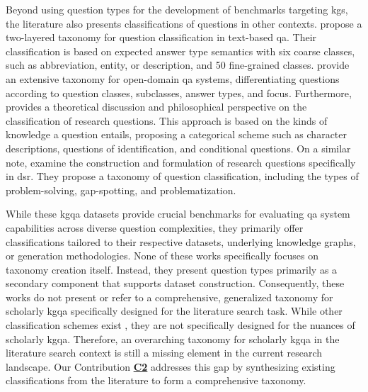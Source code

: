 Beyond using question types for the development of benchmarks targeting \glspl{kg}, the literature also presents classifications of questions in other contexts. \textcite{li_learning_2002} propose a two-layered taxonomy for question classification in text-based \gls{qa}. Their classification is based on expected answer type semantics with six coarse classes, such as abbreviation, entity, or description, and 50 fine-grained classes. \textcite{moldovan_structure_2000} provide an extensive taxonomy for open-domain \gls{qa} systems, differentiating questions according to question classes, subclasses, answer types, and focus. Furthermore, \textcite{dillon_classification_1984} provides a theoretical discussion and philosophical perspective on the classification of research questions. This approach is based on the kinds of knowledge a question entails, proposing a categorical scheme such as character descriptions, questions of identification, and conditional questions. On a similar note, \textcite{thuan_construction_2019} examine the construction and formulation of research questions specifically in \gls{dsr}. They propose a taxonomy of question classification, including the types of problem-solving, gap-spotting, and problematization. 

While these \gls{kgqa} datasets \cite{dubey_lc-quad_2019,auer_sciqa_2023,banerjee_dblp-quad_2023,jaradeh_question_2020} provide crucial benchmarks for evaluating \gls{qa} system capabilities across diverse question complexities, they primarily offer classifications tailored to their respective datasets, underlying knowledge graphs, or generation methodologies. None of these works specifically focuses on taxonomy creation itself. Instead, they present question types primarily as a secondary component that supports dataset construction. Consequently, these works do not present or refer to a comprehensive, generalized taxonomy for scholarly \gls{kgqa} specifically designed for the literature search task. While other classification schemes exist \cite{li_learning_2002,moldovan_structure_2000,dillon_classification_1984,thuan_construction_2019}, they are not specifically designed for the nuances of scholarly \gls{kgqa}. Therefore, an overarching taxonomy for scholarly \gls{kgqa} in the literature search context is still a missing element in the current research landscape. Our Contribution \hyperref[enum:c2]{\textbf{C2}} addresses this gap by synthesizing existing classifications from the literature to form a comprehensive taxonomy.
